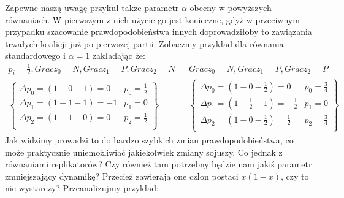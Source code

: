 Zapewne naszą uwagę przykuł także parametr $\alpha$ obecny w powyższych równaniach. W pierwszym z nich użycie go jest konieczne, gdyż w przeciwnym przypadku szacowanie prawdopodobieństwa innych doprowadziłoby to zawiązania trwałych koalicji już po pierwszej partii. Zobaczmy przykład dla równania standardowego i $\alpha = 1$ zakładając że:
\begin{align*}
p_i = \frac{1}{2}, Gracz_0 = N, Gracz_1 = P, Gracz_2 = N && Gracz_0 = N, Gracz_1 = P, Gracz_2 = P\\
\left\{
\begin{array}{ll}
\Delta p_0 = (1 - 0 - 1) =  0 & p_0=\frac{1}{2}\\
\Delta p_1 = (1 - 1 - 1) =  -1 & p_1= 0\\
\Delta p_2 = (1 - 1 - 0) =  0 & p_2=\frac{1}{2}\\
\end{array} 
\right\} &&
\left\{
\begin{array}{ll}
\Delta p_0 = (1 - 0 - \frac{1}{2}) =  0 & p_0=\frac{3}{4}\\
\Delta p_1 = (1 - \frac{1}{2} - 1) =  -\frac{1}{2} & p_1= 0\\
\Delta p_2 = (1 - 0 - \frac{1}{2}) =  \frac{1}{2} & p_2=\frac{3}{4}\\
\end{array}
\right\}
\end{align*}
Jak widzimy prowadzi to do bardzo szybkich zmian prawdopodobieństwa, co może praktycznie uniemożliwiać jakiekolwiek zmiany sojuszy. Co jednak z równaniami replikatorów? Czy również tam potrzebny będzie nam jakiś parametr zmniejszający dynamikę? Przecież zawierają one człon postaci $x(1-x)$, czy to nie wystarczy? Przeanalizujmy przykład: 
